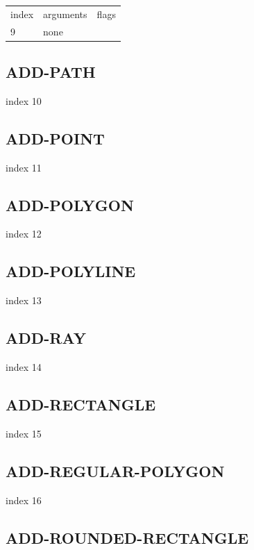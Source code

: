 \documentclass[a4paper]{report}
\begin{document}
\begin{center}
\begin{tabular}{l | l | l}
index & arguments & flags \\
9 & none & 
\end{tabular}
\end{center}

\subsection{ADD-PATH}

index 10

\subsection{ADD-POINT}

index 11

\subsection{ADD-POLYGON}

index 12

\subsection{ADD-POLYLINE}

index 13

\subsection{ADD-RAY}

index 14

\subsection{ADD-RECTANGLE}

index 15

\subsection{ADD-REGULAR-POLYGON}

index 16

\subsection{ADD-ROUNDED-RECTANGLE}
\end{document}
